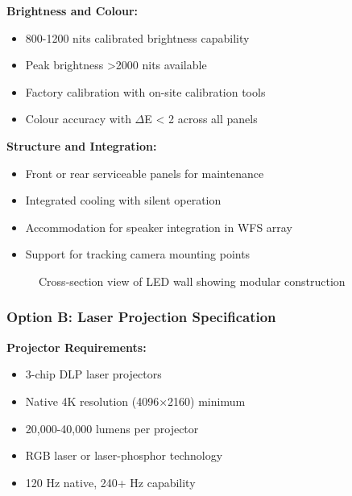 \textbf{Brightness and Colour:}
\begin{itemize}
    \item 800-1200 nits calibrated brightness capability
    \item Peak brightness >2000 nits available
    \item Factory calibration with on-site calibration tools
    \item Colour accuracy with $\Delta$E < 2 across all panels
\end{itemize}

\textbf{Structure and Integration:}
\begin{itemize}
    \item Front or rear serviceable panels for maintenance
    \item Integrated cooling with silent operation
    \item Accommodation for speaker integration in WFS array
    \item Support for tracking camera mounting points
\end{itemize}

\begin{figure}[h]
\centering
{}
\caption{Cross-section view of LED wall showing modular construction}
\end{figure}

\subsubsection{Option B: Laser Projection Specification}

\textbf{Projector Requirements:}
\begin{itemize}
    \item 3-chip DLP laser projectors
    \item Native 4K resolution (4096×2160) minimum
    \item 20,000-40,000 lumens per projector
    \item RGB laser or laser-phosphor technology
    \item 120 Hz native, 240+ Hz capability
\end{itemize}

